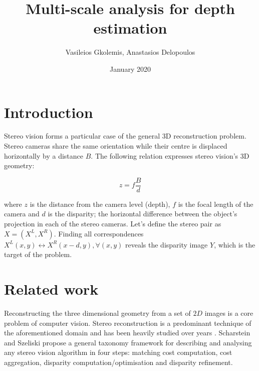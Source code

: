 \documentclass[10pt]{article}
\title{Multi-scale analysis for depth estimation}
\author{Vasileios Gkolemis, Anastasios Delopoulos}
\date{January 2020}
\begin{document}
\maketitle

\section{Introduction}

Stereo vision forms a particular case of the general 3D reconstruction problem. Stereo cameras share the same orientation while their centre is displaced horizontally by a distance $B$. The following relation expresses stereo vision's 3D geometry:

\begin{equation} \label{eq:stereo_geometry}
z = f\frac{B}{d}
\end{equation}

where $z$ is the distance from the camera level (depth), $f$ is the focal length of the camera and $d$ is the disparity; the horizontal difference between the object's projection in each of the stereo cameras. Let's define the stereo pair as $X = (X^L, X^R)$. Finding all correspondences $X^L(x,y) \leftrightarrow X^R(x-d, y), \forall (x,y)$ reveals the disparity image $Y$, which is the target of the problem.

\section{Related work}

Reconstructing the three dimensional geometry from a set of $2D$ images is a core problem of computer vision. Stereo reconstruction is a predominant technique of the aforementioned domain and has been heavily studied over years \cite{Barnard1982ComputationalStereo, Brown2003}. Scharstein and Szeliski \cite{Scharstein2001AAlgorithms} propose a general taxonomy framework for describing and analysing any stereo vision algorithm in four steps: matching cost computation, cost aggregation, disparity computation/optimisation and disparity refinement.
\end{document}
